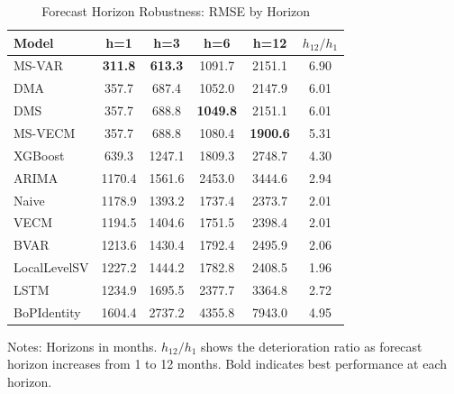 \begin{table}[htbp]
\centering
\small
\caption{Forecast Horizon Robustness: RMSE by Horizon}
\label{tab:horizon}
\begin{tabular}{lccccc}
\toprule
Model & h=1 & h=3 & h=6 & h=12 & $h_{12}/h_1$ \\
\midrule
MS-VAR & \textbf{311.8} & \textbf{613.3} & 1091.7 & 2151.1 & 6.90 \\
DMA & 357.7 & 687.4 & 1052.0 & 2147.9 & 6.01 \\
DMS & 357.7 & 688.8 & \textbf{1049.8} & 2151.1 & 6.01 \\
MS-VECM & 357.7 & 688.8 & 1080.4 & \textbf{1900.6} & 5.31 \\
XGBoost & 639.3 & 1247.1 & 1809.3 & 2748.7 & 4.30 \\
ARIMA & 1170.4 & 1561.6 & 2453.0 & 3444.6 & 2.94 \\
Naive & 1178.9 & 1393.2 & 1737.4 & 2373.7 & 2.01 \\
VECM & 1194.5 & 1404.6 & 1751.5 & 2398.4 & 2.01 \\
BVAR & 1213.6 & 1430.4 & 1792.4 & 2495.9 & 2.06 \\
LocalLevelSV & 1227.2 & 1444.2 & 1782.8 & 2408.5 & 1.96 \\
LSTM & 1234.9 & 1695.5 & 2377.7 & 3364.8 & 2.72 \\
BoPIdentity & 1604.4 & 2737.2 & 4355.8 & 7943.0 & 4.95 \\
\bottomrule
\end{tabular}
\begin{tablenotes}
\small
\item Notes: Horizons in months. $h_{12}/h_1$ shows the deterioration 
ratio as forecast horizon increases from 1 to 12 months. 
Bold indicates best performance at each horizon.
\end{tablenotes}
\end{table}